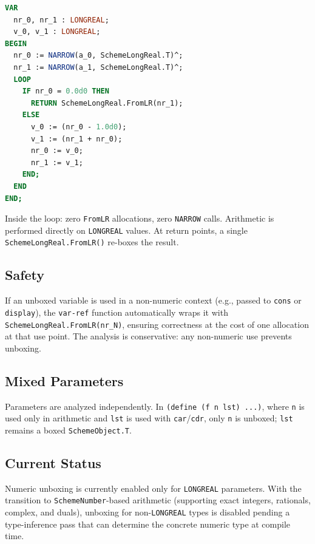 \documentclass[12pt]{report}
\begin{document}
\begin{lstlisting}[language=Modula3]
VAR
  nr_0, nr_1 : LONGREAL;
  v_0, v_1 : LONGREAL;
BEGIN
  nr_0 := NARROW(a_0, SchemeLongReal.T)^;
  nr_1 := NARROW(a_1, SchemeLongReal.T)^;
  LOOP
    IF nr_0 = 0.0d0 THEN
      RETURN SchemeLongReal.FromLR(nr_1);
    ELSE
      v_0 := (nr_0 - 1.0d0);
      v_1 := (nr_1 + nr_0);
      nr_0 := v_0;
      nr_1 := v_1;
    END;
  END
END;
\end{lstlisting}

\noindent
Inside the loop: zero \texttt{FromLR} allocations, zero
\texttt{NARROW} calls.  Arithmetic is performed directly on
\texttt{LONGREAL} values.  At return points, a single
\texttt{SchemeLongReal.FromLR()} re-boxes the result.

\subsection{Safety}

If an unboxed variable is used in a non-numeric context (e.g.,
passed to \texttt{cons} or \texttt{display}), the \texttt{var-ref}
function automatically wraps it with
\texttt{SchemeLongReal.FromLR(nr\_N)}, ensuring correctness at the
cost of one allocation at that use point.  The analysis is
conservative: any non-numeric use prevents unboxing.

\subsection{Mixed Parameters}

Parameters are analyzed independently.  In
\texttt{(define (f n lst) ...)}, where \texttt{n} is used only in
arithmetic and \texttt{lst} is used with \texttt{car}/\texttt{cdr},
only \texttt{n} is unboxed; \texttt{lst} remains a boxed
\texttt{SchemeObject.T}.

\subsection{Current Status}

Numeric unboxing is currently enabled only for \texttt{LONGREAL}
parameters.  With the transition to \texttt{SchemeNumber}-based
arithmetic (supporting exact integers, rationals, complex, and
duals), unboxing for non-\texttt{LONGREAL} types is disabled
pending a type-inference pass that can determine the concrete
numeric type at compile time.

\end{document}
